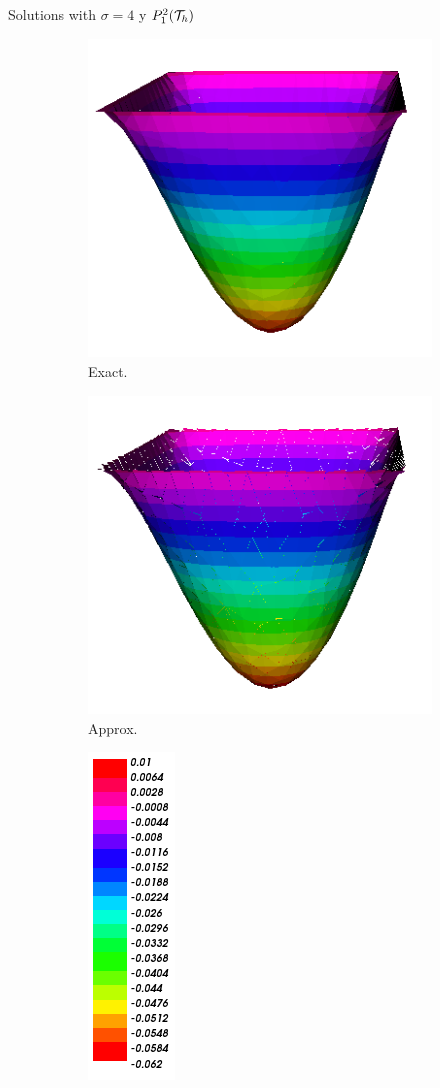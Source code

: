 \begin{frame}{Solutions with $\sigma=4$ y $\relax{P}^2_1(\mathcal{T}_h)$}
		\begin{figure}[h!]
			\begin{subfigure}[b]{0.2\textwidth}
				\centering
				\includegraphics[scale=0.16]{img/Difusion/Recortes/steady_diffusion_exact_n_16.png}
				\caption{\scriptsize Exact.}
			\end{subfigure}
			\begin{subfigure}[b]{0.2\textwidth}
				\centering
				\includegraphics[scale=0.16]{img/Difusion/Recortes/steady_diffusion_approx_n_16.png}
				\caption{\scriptsize Approx.}
			\end{subfigure}
			\begin{subfigure}[b]{0.1\textwidth}
				\centering
				\includegraphics[scale=0.23]{img/Difusion/Recortes/steady_diffusion_values.png}

\end{subfigure}
\end{figure}
\end{frame}
